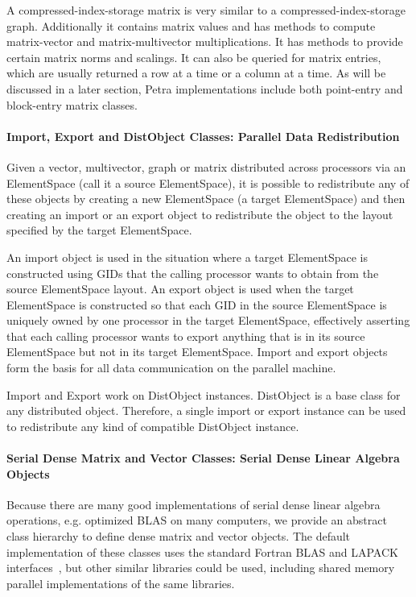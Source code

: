\documentclass[10pt,relax]{PetraObjectModel}
\begin{document}
A compressed-index-storage matrix is very similar to a
compressed-index-storage graph. Additionally it contains matrix
values and has methods to compute matrix-vector and
matrix-multivector multiplications.  It has methods to provide
certain matrix norms and scalings.  It can also be queried for
matrix entries, which are usually returned a row at a time or a
column at a time. As will be discussed in a later section, Petra
implementations include both point-entry and block-entry matrix
classes.


\paragraph{Import, Export and DistObject Classes:  Parallel Data Redistribution}

Given a vector, multivector, graph or matrix distributed across
processors via an ElementSpace (call it a source ElementSpace), it
is possible to redistribute any of these objects by creating a new
ElementSpace (a target ElementSpace) and then creating an import or
an export object to redistribute the object to the layout specified
by the target ElementSpace.

An import object is used in the situation where a target
ElementSpace is constructed using GIDs that the calling processor
wants to obtain from the source ElementSpace layout.  An export
object is used when the target ElementSpace is constructed so that
each GID in the source ElementSpace is uniquely owned by one
processor in the target ElementSpace, effectively asserting that
each calling processor wants to export anything that is in its
source ElementSpace but not in its target ElementSpace.  Import and
export objects form the basis for all data communication on the
parallel machine.

Import and Export work on DistObject instances.  DistObject is a
base class for any distributed object.  Therefore, a single import
or export instance can be used to redistribute any kind of
compatible DistObject instance.

\paragraph{Serial Dense Matrix and Vector Classes:  Serial Dense Linear Algebra Objects}

Because there are many good implementations of serial dense linear algebra
operations, e.g. optimized BLAS on many computers, we provide an abstract
class hierarchy to define dense matrix and vector objects.  The default
implementation of these classes uses the standard Fortran BLAS and LAPACK
interfaces~\cite{BLAS1,BLAS2,BLAS3,LAPACK}, but other similar libraries could
be used, including shared memory parallel implementations of the same
libraries.
\end{document}
